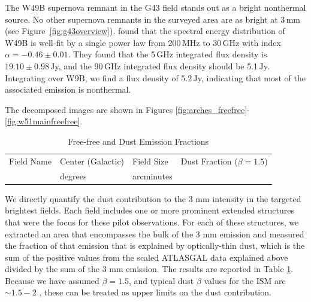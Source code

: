 \documentclass[twocolumn]{aastex62}
\begin{document}
The W49B supernova remnant in the G43 field stands out as a bright nonthermal
source.  No other supernova remnants in the surveyed area are as bright at 3\,mm (see
Figure~\ref{fig:g43overview}). \citet{Sun2011a} found that the spectral energy
distribution of W49B is well-fit by a single power law from 200\,MHz to 30\,GHz
with index $\alpha=-0.46\pm0.01$.  They found that the 5\,GHz integrated flux density is
$19.10\pm0.98$\,Jy, and the 90\,GHz integrated flux density should be 5.1\,Jy.
Integrating over W9B, we find a flux density of 5.2\,Jy, indicating that most of
the associated emission is nonthermal. 

The decomposed images are shown in Figures
\ref{fig:arches_freefree}-\ref{fig:w51mainfreefree}.

\begin{table}[htp]
\centering
\caption{Free-free and Dust Emission Fractions}
\begin{tabular}{llll}
    \label{tab:freefree}
Field Name   & Center (Galactic) & Field Size & Dust Fraction ($\beta=1.5$) \\
             & degrees           & arcminutes &                             \\
\hline
\hline

\hline
\hline
\end{tabular}
\end{table}

We directly quantify the dust contribution to the 3 mm intensity in the
targeted brightest fields.  Each field includes one or more prominent extended
structures that were the focus for these pilot observations.  For each of these
structures, we extracted an area that encompasses the bulk of the 3 mm emission
and measured the fraction of that emission that is explained by optically-thin
dust, which is the sum of the positive values from the scaled ATLASGAL data
explained above divided by the sum of the 3 mm emission.  The results are reported
in Table \ref{tab:freefree}.  Because we have assumed $\beta=1.5$, and typical
dust $\beta$ values for the ISM are $\sim1.5-2$ \citep[e.g.,][]{Ossenkopf1994a},
these can be treated as upper limits on the dust contribution.
\end{document}
